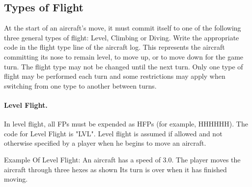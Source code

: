 


\subsection{Types of Flight}

At the start of an aircraft's move, it must commit itself to one of the following three general types of flight: Level, Climbing or Diving. Write the appropriate code in the flight type line of the aircraft log. This represents the aircraft committing its nose to remain level, to move up, or to move down for the game turn. The flight type may not be changed until the next turn. Only one type of flight may be performed each turn and some restrictions may apply when switching from one type to another between turns.

\paragraph{Level Flight.} In level flight, all FPs must be expended as HFPs (for example, HHHHHH). The code for Level Flight is "LVL". Level flight is assumed if allowed and not otherwise specified by a player when he begins to move an aircraft.

Example Of Level Flight: An aircraft has a speed of 3.0. The player moves the aircraft through three hexes as shown  Its turn is over when it has finished moving.

